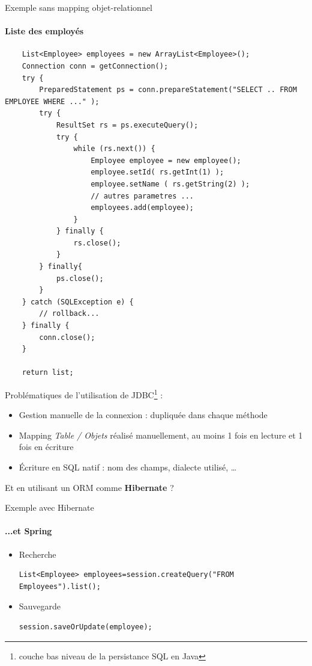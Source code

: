 \documentclass[compact]{beamer}%
\begin{document}
\begin{frame}[containsverbatim]{Exemple sans mapping objet-relationnel}
	\framesubtitle{Liste des employés}
	\begin{lstlisting}
	List<Employee> employees = new ArrayList<Employee>();
	Connection conn = getConnection();
	try {
		PreparedStatement ps = conn.prepareStatement("SELECT .. FROM EMPLOYEE WHERE ..." );
		try {
			ResultSet rs = ps.executeQuery();
			try {
				while (rs.next()) {
					Employee employee = new employee();
					employee.setId( rs.getInt(1) );
					employee.setName ( rs.getString(2) );
					// autres parametres ...
					employees.add(employee);
				}
			} finally {
				rs.close();
			}
		} finally{ 
			ps.close(); 
		}
	} catch (SQLException e) { 
		// rollback...
	} finally { 
		conn.close(); 
	}
	
	return list;
	\end{lstlisting}	
	
\end{frame}
	
\begin{frame}
	Problématiques de l'utilisation de JDBC\footnote{couche bas niveau de la persistance SQL en Java} :
	\begin{itemize}
	\item Gestion manuelle de la connexion : dupliquée dans chaque méthode
	\item Mapping \emph{Table / Objets} réalisé manuellement, au moins 1 fois en lecture et 1 fois en écriture
	\item Écriture en SQL natif : nom des champs, dialecte utilisé, \dots
	\end{itemize}
	
	\pause
	\begin{block}{}
	\center
	Et en utilisant un ORM comme \textbf{Hibernate} ?
	\end{block}
		
\end{frame}
		
\begin{frame}[fragile]{Exemple avec Hibernate}
	\framesubtitle{...et Spring}
	
	\begin{itemize}[<+->]
	\item Recherche
	\begin{lstlisting}
List<Employee> employees=session.createQuery("FROM Employees").list();
\end{lstlisting}
	\item Sauvegarde
	\begin{lstlisting}
session.saveOrUpdate(employee);
	\end{lstlisting}	
	\end{itemize}	
\end{frame}
\end{document}
